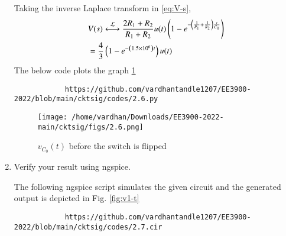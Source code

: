 \documentclass[journal,12pt,twocolumn]{IEEEtran}
\renewcommand\thesection{\arabic{section}}
\begin{document}
\begin{enumerate}[label=\arabic*.,ref=\thesection.\theenumi]
		\solution Taking the inverse Laplace transform in \eqref{eq:V-s},
		\begin{align}
			&V(s) \overset{\mathcal{L}}{\longleftrightarrow} \frac{2R_1 + R_2}{R_1 + R_2}u(t)\left(1 - e^{-\left(\frac{1}{R_1} + \frac{1}{R_2}\right)\frac{t}{C_0}}\right) \\
			&= \frac{4}{3}\left(1 - e^{-\left(1.5 \times 10^6\right)t}\right)u(t)
		\end{align}
		The below code plots the graph \ref{fig:v1-t}
		\begin{lstlisting}
			https://github.com/vardhantandle1207/EE3900-2022/blob/main/cktsig/codes/2.6.py
		\end{lstlisting}
		
		\begin{figure}[!htb]
			\texttt{[image: /home/vardhan/Downloads/EE3900-2022-main/cktsig/figs/2.6.png]}
			\caption{$v_{C_0}(t)$ before the switch is flipped}
			\label{fig:v1-t}
		\end{figure}
		\item Verify your result using ngspice.
		
		\solution The following ngspice script simulates the given circuit and the generated output is depicted in Fig. \eqref{fig:v1-t}
		\begin{lstlisting}
			https://github.com/vardhantandle1207/EE3900-2022/blob/main/cktsig/codes/2.7.cir
		\end{lstlisting}
	\end{enumerate}
	
\end{document}

